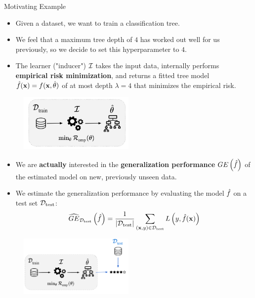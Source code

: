 \begin{frame}{Motivating Example}

\begin{itemize}
\item Given a dataset, we want to train a classification tree.
\item We feel that a maximum tree depth of $4$ has worked out well for us previously, so we decide to set this hyperparameter to $4$.
\item The learner ("inducer") $\mathcal{I}$ takes the input data, internally performs \textbf{empirical risk minimization}, and returns a fitted tree model $\hat{f}(\mathbf{x}) = f(\mathbf{x}, \hat{\theta})$ of at most depth $\lambda = 4$ that minimizes the empirical risk.
\end{itemize}

\begin{center}
\begin{figure}
\includegraphics[width=0.5\textwidth]{images/riskmin_bilevel1.png}
\end{figure}
\end{center}

\framebreak

\begin{itemize}
\item We are \textbf{actually} interested in the \textbf{generalization performance} $GE\left(\hat{f}\right)$ of the estimated model on new, previously unseen data.
\item We estimate the generalization performance by evaluating the model $\hat{f}$ on a test set $\mathcal{D}_{\text{test}}$: $$
\widehat{GE}_{\mathcal{D}_{\text{test}}}\left(\hat{f}\right) = \frac{1}{|\mathcal{D}_{\text{test}}|} \sum\limits_{(\mathbf{x}, y) \in \mathcal{D}_{\text{test}}} L\left(y, \hat{f}(\mathbf{x}) \right)
$$
\end{itemize}
\vspace*{-0.6cm}
\begin{center}
\begin{figure}
\includegraphics[width=0.5\textwidth]{images/riskmin_bilevel2.png}
\end{figure}
\end{center}


\end{frame}
